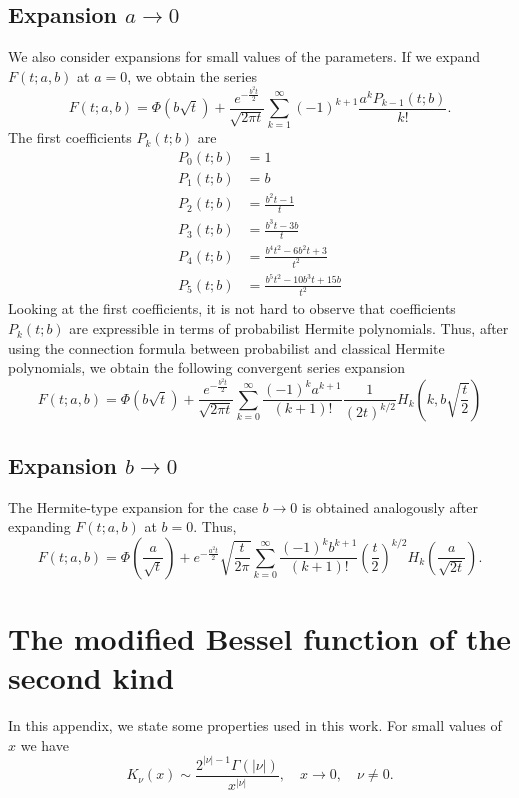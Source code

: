 \documentclass[10pt,a4paper,oneside]{article}
\numberwithin{equation}{section}
\begin{document}
\subsection{Expansion $a \to 0$}
We also consider expansions for small values of the parameters. If we expand $F(t; a, b)$ at $a = 0$, we obtain the series
\begin{equation}
F(t; a, b) = \Phi\left(b\sqrt{t}\right) + \frac{e^{-\frac{b^2 t}{2}}}{\sqrt{2\pi t}}\sum_{k=1}^{\infty} (-1)^{k+1} \frac{a^k P_{k-1}(t; b)}{k!}.
\end{equation}
The first coefficients $P_k(t; b)$ are
\begin{align*}
P_0(t; b) &= 1\\
P_1(t; b) &= b\\
P_2(t; b) &= \frac{b^2 t - 1}{t}\\
P_3(t; b) &= \frac{b^3 t - 3b}{t}\\
P_4(t; b) &= \frac{b^4 t^2 - 6b^2t + 3}{t^2}\\
P_5(t; b) &= \frac{b^5 t^2 - 10b^3 t + 15 b}{t^2}
\end{align*}
Looking at the first coefficients, it is not hard to observe that coefficients $P_k(t;b)$ are expressible in terms of probabilist Hermite polynomials. Thus, after using the connection formula between probabilist and classical Hermite polynomials, we obtain the following convergent series expansion
\begin{equation}\label{phi_expansion_a_small}
F(t; a, b) = \Phi\left(b\sqrt{t}\right) + \frac{e^{-\frac{b^2 t}{2}}}{\sqrt{2\pi t}} \sum_{k=0}^{\infty} \frac{(-1)^k a^{k+1}}{(k+1)!}\frac{1}{(2t)^{k/2}} H_k\left(k, b\sqrt{\frac{t}{2}}\right)
\end{equation}

\subsection{Expansion $b \to 0$}
The Hermite-type expansion for the case $b \to 0$ is obtained analogously after expanding $F(t; a, b)$ at $b=0$. Thus,
\begin{equation}\label{phi_expansion_b_small}
F(t; a, b) = \Phi\left(\frac{a}{\sqrt{t}}\right) + e^{-\frac{a^2 t}{2}}\sqrt{\frac{t}{2\pi}} \sum_{k=0}^{\infty}\frac{(-1)^k b^{k+1}}{(k + 1)!}\left(\frac{t}{2}\right)^{k/2} H_k\left(\frac{a}{\sqrt{2t}}\right).
\end{equation}

\section{The modified Bessel function of the second kind}\label{appendix_modified_bessel}
In this appendix, we state some properties used in this work. For small values of $x$ we have
\begin{equation}\label{besselk_x_to_0}
K_{\nu}(x) \sim \frac{2^{|\nu| - 1} \Gamma(|\nu|)}{x^{|\nu|}}, \quad x \to 0, \quad \nu \neq 0.
\end{equation}
\end{document}
